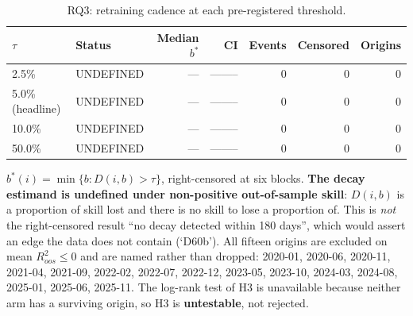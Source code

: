 \begin{table}[!t]
\centering
\caption{RQ3: retraining cadence at each pre-registered threshold.}
\label{tab:decay}
\begin{tabular}{llrrrrr}
\toprule
$\tau$ & Status & Median $b^{*}$ & CI & Events & Censored & Origins \\
\midrule
2.5\% & UNDEFINED & --- & -------- & 0 & 0 & 0 \\
5.0\% (headline) & UNDEFINED & --- & -------- & 0 & 0 & 0 \\
10.0\% & UNDEFINED & --- & -------- & 0 & 0 & 0 \\
50.0\% & UNDEFINED & --- & -------- & 0 & 0 & 0 \\
\bottomrule
\end{tabular}
\vspace{2pt}\par\footnotesize $b^{*}(i) = \min\{b : D(i,b) > \tau\}$, right-censored at six blocks. \textbf{The decay estimand is undefined under non-positive out-of-sample skill}: $D(i,b)$ is a proportion of skill lost and there is no skill to lose a proportion of. This is \emph{not} the right-censored result ``no decay detected within 180 days'', which would assert an edge the data does not contain (`D60b'). All fifteen origins are excluded on mean $R^2_{oos} \leq 0$ and are named rather than dropped: 2020-01, 2020-06, 2020-11, 2021-04, 2021-09, 2022-02, 2022-07, 2022-12, 2023-05, 2023-10, 2024-03, 2024-08, 2025-01, 2025-06, 2025-11. The log-rank test of H3 is unavailable because neither arm has a surviving origin, so H3 is \textbf{untestable}, not rejected.
\end{table}

